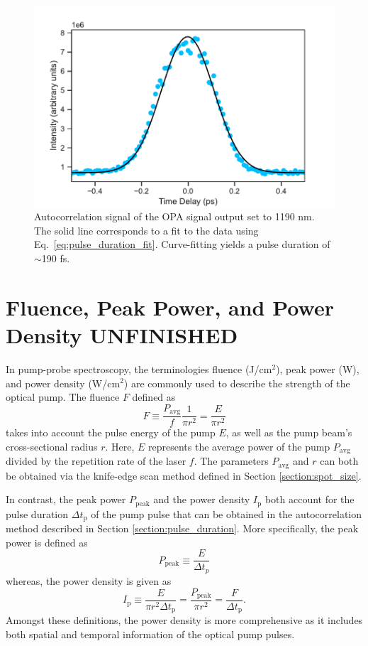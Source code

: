 \begin{figure}[ht]
	\centering
	\includegraphics[scale=0.6]{images/chapter_methods/opa_pump_autocorr}
		\caption{Autocorrelation signal of the OPA signal output set to 1190 nm. The solid line corresponds to a fit to the data using Eq.\ \eqref{eq:pulse_duration_fit}. Curve-fitting yields a pulse duration of $\sim$190 fs.}
		\label{fig:opa_autocorr}
\end{figure}

\section{Fluence, Peak Power, and Power Density {\color{red} UNFINISHED}}
In pump-probe spectroscopy, the terminologies fluence (J/cm$^2$), peak power (W), and power density (W/cm$^2$) are commonly used to describe the strength of the optical pump. The fluence $F$ defined as
\begin{equation}
	F \equiv \dfrac{P_\text{avg}}{f} \dfrac{1}{\pi r^2} = \dfrac{E}{\pi r^2}
\end{equation}
takes into account the pulse energy of the pump $E$, as well as the pump beam's cross-sectional radius $r$. Here, $E$ represents the average power of the pump $P_\text{avg}$ divided by the repetition rate of the laser $f$. The parameters $P_\text{avg}$ and $r$ can both be obtained via the knife-edge scan method defined in Section \ref{section:spot_size}.

In contrast, the peak power $P_\text{peak}$ and the power density $I_\text{p}$ both account for the pulse duration $\Delta t_\text{p}$ of the pump pulse that can be obtained in the autocorrelation method described in Section \ref{section:pulse_duration}. More specifically, the peak power is defined as
\begin{equation}
	P_\text{peak} \equiv \dfrac{E}{\Delta t_p}
\end{equation}
whereas, the power density is given as
\begin{equation}
	I_\text{p} \equiv \dfrac{E}{\pi r^2 \Delta t_\text{p}} = \dfrac{P_\text{peak}}{\pi r^2} =\dfrac{F}{\Delta t_\text{p}}.
\end{equation}
Amongst these definitions, the power density is more comprehensive as it includes both spatial and temporal information of the optical pump pulses.
